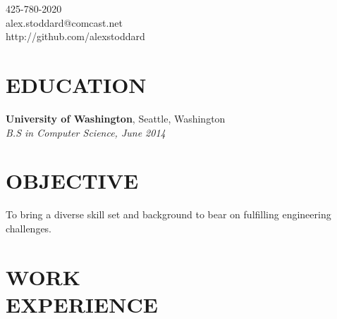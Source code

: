 \documentclass[margin,line]{resume}
\begin{document}
{
    \sc
    \hfill 425-780-2020                   \vspace{0mm}\\\vspace{0mm}%
    \hfill alex.stoddard@comcast.net         \vspace{0mm}\\\vspace{0mm}%
    \hfill http://github.com/alexstoddard         \vspace{0mm}\\\vspace{0mm}%
}

\begin{resume}

    \section{\mysidestyle \textbf{\large{E}\small{DUCATION}}}

    \textbf{\listing University of Washington}, Seattle, Washington \vspace{2mm}\\\vspace{1mm}%
    \textsl{B.S in Computer Science, June 2014} \hfill \vspace{-3mm}\\\vspace{-1mm}%

\sectionline

    \section{\mysidestyle \textbf{\large{O}\small{BJECTIVE}}}

    To bring a diverse skill set and background to bear on fulfilling engineering challenges.\vspace{-3mm}\\\vspace{-1mm}%

\sectionline

    \section{\mysidestyle \textbf{\large{W}\small{ORK\\EXPERIENCE}}}


\end{resume}
\end{document}
